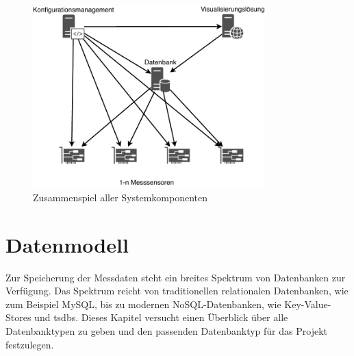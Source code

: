 \documentclass[titlepage]{report}
\begin{document}
\begin{figure}[H]
    \centering
    \includegraphics[width=0.8\textwidth]{figures/network.pdf}
    \caption{Zusammenspiel aller Systemkomponenten}\label{fig:network}
\end{figure}
\section*{Datenmodell}
Zur Speicherung der Messdaten steht ein breites Spektrum von Datenbanken
zur Verfügung. Das Spektrum reicht von traditionellen relationalen
Datenbanken, wie zum Beispiel MySQL, bis zu modernen
NoSQL\hyp{}Datenbanken, wie Key\hyp{}Value\hyp{}Stores und \glspl{tsdb}.
Dieses Kapitel versucht einen Überblick über alle Datenbanktypen zu
geben und den passenden Datenbanktyp für das Projekt festzulegen.
\end{document}

